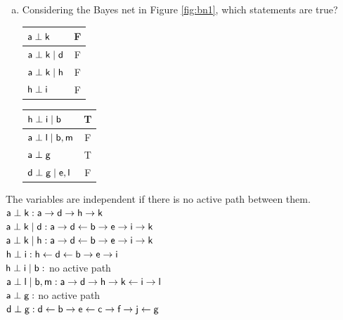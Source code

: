\documentclass[12pt,a4paper,oneside]{article}
\begin{document}
\begin{enumerate}[a)]
\item Considering the Bayes net in Figure \ref{fig:bn1}, which statements are
  true?

  \vspace{0.2cm}
  \begin{tabular}{|l|c|}
    \hline
    $\rv{a} \perp \rv{k}$ & F \\ \hline
    $\rv{a} \perp \rv{k} \; | \; \rv{d}$ & F \\ \hline
    $\rv{a} \perp \rv{k} \; | \; \rv{h}$ & F\\ \hline
    $\rv{h} \perp \rv{i}$ & F\\ \hline
  \end{tabular}
  \hspace{0.2cm}
  \begin{tabular}{|l|c|}
    \hline
    $\rv{h} \perp \rv{i} \; | \; \rv{b}$ & T \\ \hline
    $\rv{a} \perp \rv{l} \; | \; \rv{b}, \rv{m}$ & F\\ \hline
    $\rv{a} \perp \rv{g}$ & T\\ \hline
    $\rv{d} \perp \rv{g} \; | \; \rv{e}, \rv{l}$ & F\\ \hline
  \end{tabular}
  \vspace{0.2cm}
\end{enumerate}
The variables are independent if there is no active path between them.\\
$\rv{a} \perp \rv{k}:\rv{a}\rightarrow\rv{d}\rightarrow\rv{h}\rightarrow\rv{k}$\\
$\rv{a} \perp \rv{k} \; | \; \rv{d}:\rv{a}\rightarrow\rv{d}\leftarrow\rv{b}\rightarrow\rv{e}\rightarrow\rv{i}\rightarrow\rv{k}$ \\
$\rv{a} \perp \rv{k} \; | \; \rv{h}:\rv{a}\rightarrow\rv{d}\leftarrow\rv{b}\rightarrow\rv{e}\rightarrow\rv{i}\rightarrow\rv{k}$\\
$\rv{h} \perp \rv{i}:\rv{h}\leftarrow\rv{d}\leftarrow\rv{b}\rightarrow\rv{e}\rightarrow\rv{i}$\\
$\rv{h} \perp \rv{i} \; | \; \rv{b}:$ no active path \\
$\rv{a} \perp \rv{l} \; | \; \rv{b}, \rv{m}:\rv{a}\rightarrow\rv{d}\rightarrow\rv{h}\rightarrow\rv{k}\leftarrow\rv{i}\rightarrow\rv{l}$ \\
$\rv{a} \perp \rv{g}:$ no active path\\
$\rv{d} \perp \rv{g}:\rv{d}\leftarrow\rv{b}\rightarrow\rv{e}\leftarrow\rv{c}\rightarrow\rv{f}\rightarrow\rv{j}\leftarrow\rv{g}$ \\
\end{document}
